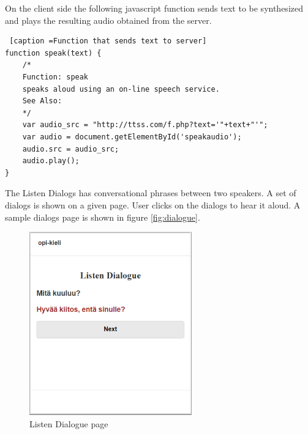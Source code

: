 \documentclass[11pt,a4paper,oneside,article]{memoir}
\begin{document}
On the client side the following javascript function sends text to be synthesized and plays the resulting audio obtained from the server.

\begin{minipage}{\linewidth}
\begin{lstlisting} [caption =Function that sends text to server]
function speak(text) {
    /*
    Function: speak
    speaks aloud using an on-line speech service.
    See Also:						
    */
    var audio_src = "http://ttss.com/f.php?text='"+text+"'";							
    var audio = document.getElementById('speakaudio');
    audio.src = audio_src;
    audio.play();						
}
\end{lstlisting}
\end{minipage}



The Listen Dialogs has conversational phrases between two speakers. A set of dialogs is shown on a given page. User clicks on the dialogs to hear it aloud. A sample dialogs page is shown in figure \vref{fig:dialogue}.

\begin{figure}[h]
\includegraphics[width=7cm]{dialogue}
\caption{Listen Dialogue page}
\label{fig:dialogue}
\end{figure}
\end{document}
